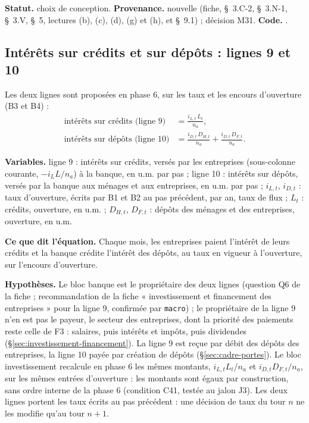 \documentclass[11pt,a4paper]{article}
\newcommand{\variables}{\par\noindent\textbf{Variables.} }
\newcommand{\sens}{\par\noindent\textbf{Ce que dit l'équation.} }
\newcommand{\hyp}{\par\noindent\textbf{Hypothèses.} }
\newcommand{\code}[1]{\texttt{\detokenize{#1}}}
\newcommand{\tracabilite}[3]{\par\smallskip\noindent\textbf{Statut.} #1. \textbf{Provenance.} #2. \textbf{Code.} \code{#3}.}
\begin{document}
\begin{proposee}
\begin{lecture}
\tracabilite{choix de conception}{nouvelle (fiche, \S~3.C-2, \S~3.N-1, \S~3.V, \S~5, lectures (b), (c), (d), (g) et (h), et \S~9.1) ; décision M31}{nations.blocs.banque}
\end{lecture}
\end{proposee}

\subsection{Intérêts sur crédits et sur dépôts : lignes 9 et 10}
\label{sec:banque-interets}
\begin{proposee}
Les deux lignes sont proposées en phase 6, sur les taux et les encours d'ouverture (B3 et B4) :
\begin{align}
\text{intérêts sur crédits (ligne 9)} &= \frac{i_{L,t}\, L_t}{n_a} , \tag{B3}\label{eq:banque-interets-credits} \\
\text{intérêts sur dépôts (ligne 10)} &= \frac{i_{D,t}\, D_{H,t}}{n_a} + \frac{i_{D,t}\, D_{F,t}}{n_a} . \tag{B4}\label{eq:banque-interets-depots}
\end{align}
\begin{lecture}
\variables ligne 9 : intérêts sur crédits, versés par les entreprises (sous-colonne courante, $-i_L L/n_a$) à la banque, en u.m. par pas ; ligne 10 : intérêts sur dépôts, versés par la banque aux ménages et aux entreprises, en u.m. par pas ; $i_{L,t}$, $i_{D,t}$ : taux d'ouverture, écrits par B1 et B2 au pas précédent, par an, taux de flux ; $L_t$ : crédits, ouverture, en u.m. ; $D_{H,t}$, $D_{F,t}$ : dépôts des ménages et des entreprises, ouverture, en u.m.
\sens Chaque mois, les entreprises paient l'intérêt de leurs crédits et la banque crédite l'intérêt des dépôts, au taux en vigueur à l'ouverture, sur l'encours d'ouverture.
\hyp Le bloc banque est le propriétaire des deux lignes (question Q6 de la fiche ; recommandation de la fiche « investissement et financement des entreprises » pour la ligne 9, confirmée par \texttt{macro}) ; le propriétaire de la ligne 9 n'en est pas le payeur, le secteur des entreprises, dont la priorité des paiements reste celle de F3 : salaires, puis intérêts et impôts, puis dividendes (\S\ref{sec:investissement-financement}). La ligne 9 est reçue par débit des dépôts des entreprises, la ligne 10 payée par création de dépôts (\S\ref{sec:cadre-portes}). Le bloc investissement recalcule en phase 6 les mêmes montants, $i_{L,t} L_t/n_a$ et $i_{D,t} D_{F,t}/n_a$, sur les mêmes entrées d'ouverture : les montants sont égaux par construction, sans ordre interne de la phase 6 (condition C41, testée au jalon J3). Les deux lignes portent les taux écrits au pas précédent : une décision de taux du tour $n$ ne les modifie qu'au tour $n + 1$.

\end{lecture}
\end{proposee}
\end{document}
